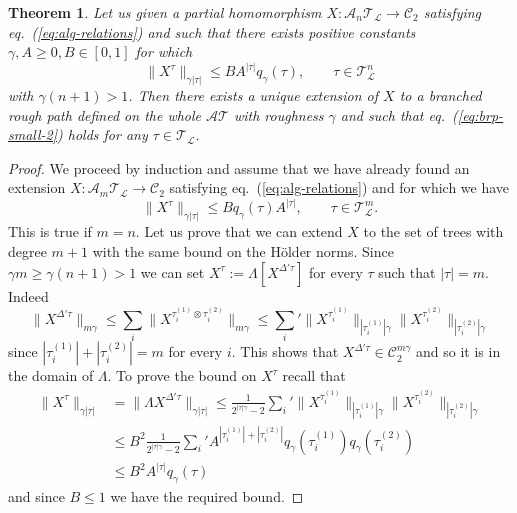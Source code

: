 \documentclass[a4paper,11pt,reqno]{article}
\newcommand{\1}{{\bf 1}}
\newcommand{\CC}{\mathcal{C}}
\newcommand{\LL}{\mathcal{L}}
\newcommand{\cl}{\mathcal L}
\newtheorem{theorem}{Theorem}[section]
\newcommand{\TT}{\mathcal{T}}
\newcommand{\cA}{\mathcal{A}}
\begin{document}
\begin{theorem}
\label{th:ext}
Let us given a partial  homomorphism  $X:
\cA_n \TT_\cl \to \CC_2$ satisfying eq.~(\ref{eq:alg-relations}) and
such that there exists positive constants $\gamma,A\ge 0,B\in[0,1]$ for which 
\begin{equation}
  \label{eq:brp-small-2}
 \| X^\tau\|_{\gamma |\tau|} \le B A^{|\tau|} q_\gamma(\tau), \qquad \tau \in \TT^n_\cl
\end{equation}
with $\gamma (n+1) > 1$. Then there exists a unique extension of $X$
to a branched rough path defined on the whole $\cA \TT$ with roughness
$\gamma$ and such that eq.~(\ref{eq:brp-small-2}) holds for any $\tau
\in \TT_\LL$.
\end{theorem}

\begin{proof}
We  proceed by induction and assume that we have already found an extension $X:\cA_m \TT_{\cl} \to \CC_2$ satisfying eq.~(\ref{eq:alg-relations}) and for which we have
\begin{equation}
  \label{eq:brp-small-3}
 \| X^\tau\|_{\gamma |\tau|} \le B q_\gamma(\tau) A^{|\tau|}, \qquad \tau \in \TT^m_\cl.
\end{equation}
 This is true if $m=n$. Let us prove that we can extend $X$ to the set of trees with degree $m+1$ with the same bound on the H\"older norms. Since $\gamma m \ge \gamma (n+1) > 1$ we can set
$
X^\tau := \Lambda\left[ X^{\Delta' \tau}\right]   
$
for every $\tau$ such that $|\tau|=m$. Indeed
$$
\|X^{\Delta' \tau}\|_{m\gamma} \le  \sum_i \|X^{\tau^{(1)}_i \otimes \tau^{(2)}_i }\|_{m\gamma} \le  \sum_i'  \|X^{\tau^{(1)}_i}\|_{|\tau^{(1)}_i|\gamma} \|X^{ \tau^{(2)}_i }\|_{|\tau^{(2)}_i|\gamma}
$$
since $|\tau^{(1)}_i|+|\tau^{(2)}_i|=m$ for every $i$. This shows that $X^{\Delta' \tau} \in \CC_2^{m\gamma}$ and so it is in the domain of $\Lambda$.
To prove the bound on $X^\tau$ recall that
\begin{equation*}
  \begin{split}
\|X^\tau\|_{\gamma|\tau|}  & =   \|\Lambda X^{\Delta' \tau}\|_{\gamma|\tau|} \le \frac{1}{2^{|\tau|\gamma}-2}   
 \sum_i'  \|X^{\tau^{(1)}_i}\|_{|\tau^{(1)}_i|\gamma} \|X^{ \tau^{(2)}_i }\|_{|\tau^{(2)}_i|\gamma}
\\ & \le B^2 \frac{1}{2^{|\tau|\gamma}-2}   
 \sum_i' A^{|\tau^{(1)}_i|+|\tau^{(2)}_i|} q_\gamma(\tau^{(1)}_i) q_\gamma(\tau^{(2)}_i)
\\ & \le B^2 A^{|\tau|} q_\gamma(\tau)
  \end{split}
\end{equation*}
and since $B \le 1$ we have the required bound.
\end{proof}
\end{document}
